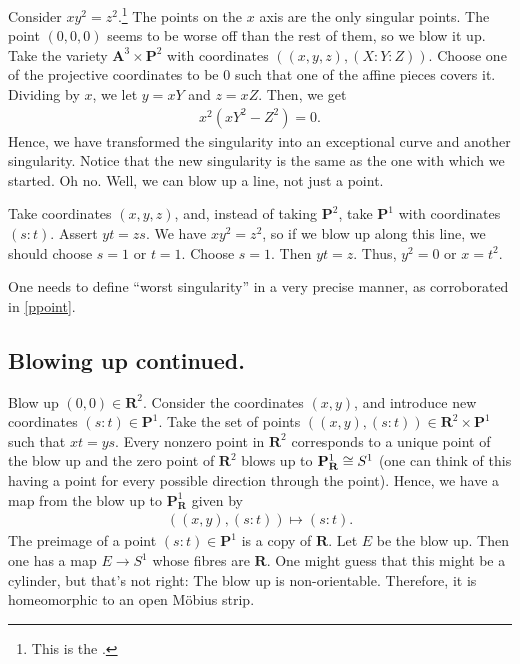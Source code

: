 \documentclass [11 pt, oneside] {article}
\begin{document}
\begin{example}\label{ppoint}
Consider $xy^2=z^2$.\footnote{This is the .} The points on the $x$ axis are the only singular points. The point $(0,0,0)$ seems to be worse off than the rest of them, so we blow it up. Take the variety $\mathbf{A}^3 \times \mathbf{P}^2$ with coordinates $((x,y,z),  (X:Y:Z))$. Choose one of the projective coordinates to be $0$ such that one of the affine pieces covers it. Dividing by $x$, we let $y=xY$ and $z=xZ$. Then, we get
\begin{align*}
	x^2(xY^2-Z^2)=0.
\end{align*}
Hence, we have transformed the singularity into an exceptional curve and another singularity. Notice that the new singularity is the same as the one with which we started. Oh no. Well, we can blow up a line, not just a point.

Take coordinates $(x,y,z)$, and, instead of taking $\mathbf{P}^2$, take $\mathbf{P}^1$ with coordinates $(s:t)$. Assert $yt=zs$. We have $xy^2=z^2$, so if we blow up along this line, we should choose $s=1$ or $t=1$. Choose $s=1$. Then $yt=z$. Thus, $y^2=0$ or $x=t^2$.
\end{example}

\begin{warn}
	One needs to define ``worst singularity'' in a very precise manner, as corroborated in \cref{ppoint}. 
\end{warn}

\subsection{Blowing up continued.}
\begin{example}\label{}
Blow up $(0,0)\in  \mathbf{R}^2$. Consider the coordinates $(x,y)$, and introduce new coordinates $(s:t) \in \mathbf{P}^1$. Take the set of points $((x,y), (s:t)) \in \mathbf{R}^2\times \mathbf{P}^1$ such that $xt=ys$. Every nonzero point in $\mathbf{R}^2$ corresponds to a unique point of the blow up and the zero point of $\mathbf{R}^2$ blows up to $\mathbf{P}^1_{\mathbf{R}}\cong S^1$  (one can think of this having a point for every possible direction through the point). Hence, we have a map from the blow up to $\mathbf{P}^1_{\mathbf{R}}$ given by
\begin{align*}
	((x,y),  (s:t)) \longmapsto (s:t).
\end{align*}
The preimage of a point $(s:t) \in \mathbf{P}^1$ is a copy of $\mathbf{R}$. Let $E$ be the blow up. Then one has a map $E\longrightarrow S^1$ whose fibres are $\mathbf{R}$. One might guess that this might be a cylinder, but that's not right: The blow up is non-orientable. Therefore, it is homeomorphic to an open M\"obius strip. 
\end{example}
\end{document}
